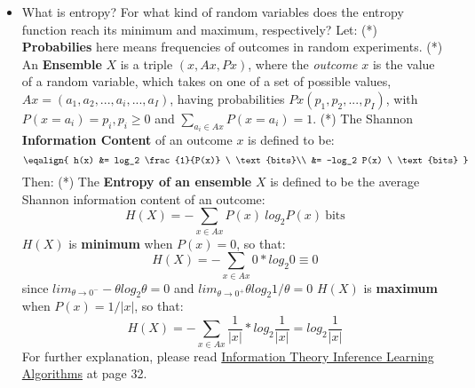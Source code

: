 \documentclass[11pt]{article}
\providecommand{\tightlist}{%
      \setlength{\itemsep}{0pt}\setlength{\parskip}{0pt}}
\begin{document}
\begin{itemize}
\tightlist
\item
  What is entropy? For what kind of random variables does the entropy
  function reach its minimum and maximum, respectively? Let: (*)
  \textbf{Probabilies} here means frequencies of outcomes in random
  experiments. (*) An \textbf{Ensemble} \(X\) is a triple
  \((x, Ax, Px)\), where the \emph{outcome} \(x\) is the value of a
  random variable, which takes on one of a set of possible values,
  \(Ax=(a_1, a_2, ..., a_i, ..., a_I)\), having probabilities
  \(Px(p_1, p_2, ..., p_I)\), with \(P(x=a_i)=p_i,p_i \geq 0\) and
  \(\sum_{a_i \in Ax} P(x=a_i)=1\). (*) The Shannon \textbf{Information
  Content} of an outcome \(x\) is defined to be: \[\eqalign{
  h(x) &= log_2 \frac{1}{P(x)} \ \text{bits}\\
       &= -log_2 P(x) \ \text{bits}
  }\] Then: (*) The \textbf{Entropy of an ensemble} \(X\) is defined to
  be the average Shannon information content of an outcome:
  \[H(X) = -\sum\limits_{x \in Ax} P(x) \ log_2 P(x) \ \text{bits}\]
  \(H(X)\) is \textbf{minimum} when \(P(x)=0\), so that:
  \[H(X) = - \sum\limits_{x \in Ax} 0 * log_2 0 \equiv 0\] since
  \(lim_{\theta \rightarrow 0^-} -\theta log_2 \theta = 0\) and
  \(lim_{\theta \rightarrow 0^+} \theta log_2 1/\theta = 0\) \(H(X)\) is
  \textbf{maximum} when \(P(x)=1/|x|\), so that:
  \[H(X) = - \sum\limits_{x \in Ax} \frac{1}{|x|} * log_2 \frac{1}{|x|} = log_2 \frac{1}{|x|}\]
  For further explanation, please read
  \href{https://www.amazon.com/Information-Theory-Inference-Learning-Algorithms/dp/0521642981}{Information
  Theory Inference Learning Algorithms} at page 32. 
\end{itemize}
\end{document}
